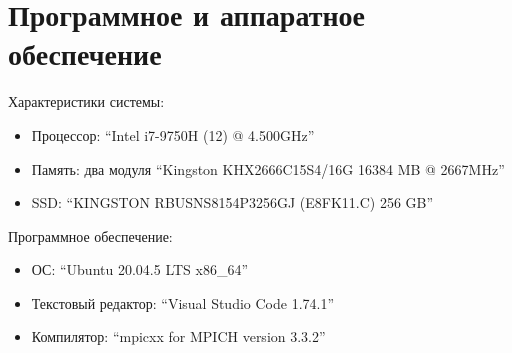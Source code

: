 \section{Программное и аппаратное обеспечение}
Характеристики системы:
\begin{itemize}[noitemsep, topsep=0pt]
	\item Процессор: \enquote{Intel i7-9750H (12) @ 4.500GHz}
	\item Память: два модуля \enquote{Kingston KHX2666C15S4/16G 16384 MB @ 2667MHz}
	\item SSD: \enquote{KINGSTON RBUSNS8154P3256GJ (E8FK11.C) 256 GB}
\end{itemize}

Программное обеспечение:
\begin{itemize}[noitemsep, topsep=0pt]
	\item ОС: \enquote{Ubuntu 20.04.5 LTS x86\_64}
	\item Текстовый редактор: \enquote{Visual Studio Code 1.74.1}
	\item Компилятор: \enquote{mpicxx for MPICH version 3.3.2}
\end{itemize}
